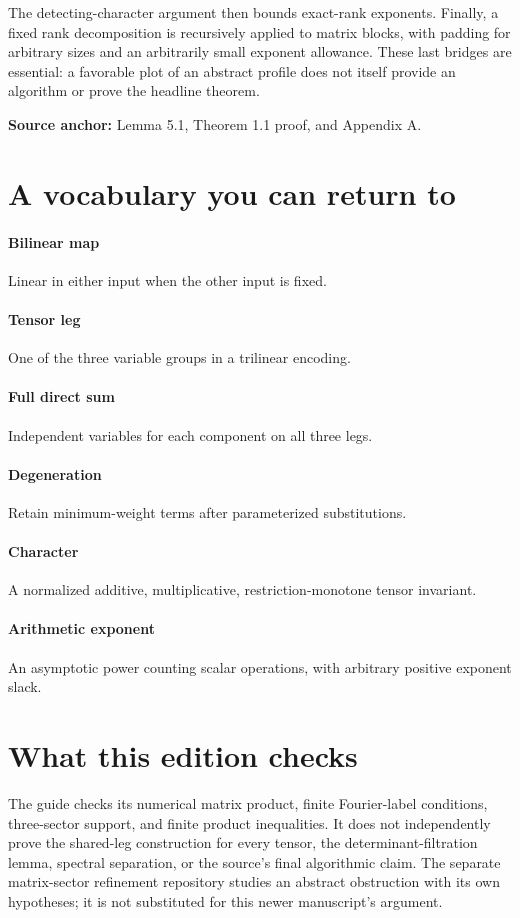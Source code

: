 \documentclass[11pt]{article}
\begin{document}
The detecting-character argument then bounds exact-rank exponents. Finally, a fixed rank decomposition is recursively applied to matrix blocks, with padding for arbitrary sizes and an arbitrarily small exponent allowance. These last bridges are essential: a favorable plot of an abstract profile does not itself provide an algorithm or prove the headline theorem.
{\footnotesize\color{blue}\textbf{Source anchor:} Lemma 5.1, Theorem 1.1 proof, and Appendix A.\par}
\newpage\section*{A vocabulary you can return to}
\paragraph{Bilinear map}Linear in either input when the other input is fixed.
\paragraph{Tensor leg}One of the three variable groups in a trilinear encoding.
\paragraph{Full direct sum}Independent variables for each component on all three legs.
\paragraph{Degeneration}Retain minimum-weight terms after parameterized substitutions.
\paragraph{Character}A normalized additive, multiplicative, restriction-monotone tensor invariant.
\paragraph{Arithmetic exponent}An asymptotic power counting scalar operations, with arbitrary positive exponent slack.
\section*{What this edition checks}The guide checks its numerical matrix product, finite Fourier-label conditions, three-sector support, and finite product inequalities. It does not independently prove the shared-leg construction for every tensor, the determinant-filtration lemma, spectral separation, or the source's final algorithmic claim. The separate matrix-sector refinement repository studies an abstract obstruction with its own hypotheses; it is not substituted for this newer manuscript's argument.
\end{document}
